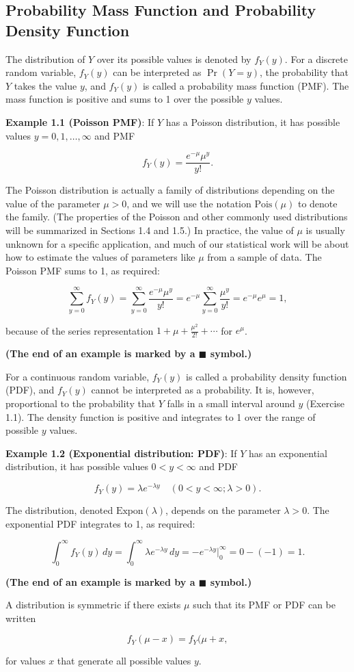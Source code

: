 \documentclass{book}
\begin{document}
\subsection{Probability Mass Function and Probability Density Function}
The distribution of \(Y\) over its possible values is denoted by \(f_Y(y)\). For a discrete random variable, \(f_Y(y)\) can be interpreted as \(\Pr(Y = y)\), the probability that \(Y\) takes the value \(y\), and \(f_Y(y)\) is called a probability mass function (PMF). The mass function is positive and sums to 1 over the possible \(y\) values.

\textbf{Example 1.1 (Poisson PMF)}: If \(Y\) has a Poisson distribution, it has possible values \(y = 0, 1, \ldots, \infty\) and PMF

\[
f_Y(y) = \frac{e^{-\mu} \mu^y}{y!}.
\]

The Poisson distribution is actually a family of distributions depending on the value of the parameter \(\mu > 0\), and we will use the notation \(\text{Pois}(\mu)\) to denote the family. (The properties of the Poisson and other commonly used distributions will be summarized in Sections 1.4 and 1.5.) In practice, the value of \(\mu\) is usually unknown for a specific application, and much of our statistical work will be about how to estimate the values of parameters like \(\mu\) from a sample of data. The Poisson PMF sums to 1, as required:

\[
\sum_{y=0}^{\infty} f_Y(y) = \sum_{y=0}^{\infty} \frac{e^{-\mu} \mu^y}{y!} = e^{-\mu} \sum_{y=0}^{\infty} \frac{\mu^y}{y!} = e^{-\mu} e^{\mu} = 1,
\]

because of the series representation \(1 + \mu + \frac{\mu^2}{2!} + \cdots\) for \(e^{\mu}\). 

\textbf{(The end of an example is marked by a \(\blacksquare\) symbol.)}

For a continuous random variable, \(f_Y(y)\) is called a probability density function (PDF), and \(f_Y(y)\) cannot be interpreted as a probability. It is, however, proportional to the probability that \(Y\) falls in a small interval around \(y\) (Exercise 1.1). The density function is positive and integrates to 1 over the range of possible \(y\) values.

\textbf{Example 1.2 (Exponential distribution: PDF)}: If \(Y\) has an exponential distribution, it has possible values \(0 < y < \infty\) and PDF

\[
f_Y(y) = \lambda e^{-\lambda y} \quad (0 < y < \infty; \lambda > 0).
\]

The distribution, denoted \(\text{Expon}(\lambda)\), depends on the parameter \(\lambda > 0\). The exponential PDF integrates to 1, as required:

\[
\int_0^{\infty} f_Y(y) \, dy = \int_0^{\infty} \lambda e^{-\lambda y} \, dy = -e^{-\lambda y} \bigg|_0^{\infty} = 0 - (-1) = 1.
\]

\textbf{(The end of an example is marked by a \(\blacksquare\) symbol.)}

A distribution is symmetric if there exists \(\mu\) such that its PMF or PDF can be written

\[
f_Y(\mu - x) = f_Y(\mu + x,
\]

for values \(x\) that generate all possible values \(y\).
\end{document}
